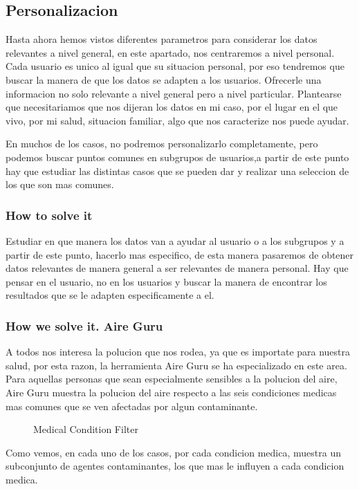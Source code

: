 \subsection{Personalizacion}
Hasta ahora hemos vistos diferentes parametros para considerar los datos relevantes a nivel general, en este apartado, nos
centraremos a nivel personal.
Cada usuario es unico al igual que su situacion personal, por eso tendremos que buscar la manera de que los datos se 
adapten a los usuarios. Ofrecerle una informacion no solo relevante a nivel general pero a nivel particular.
Plantearse que necesitariamos que nos dijeran los datos en mi caso, por el lugar en el que vivo, por
mi salud, situacion familiar, algo que nos caracterize nos puede ayudar.

En muchos de los casos, no podremos personalizarlo completamente, pero podemos buscar puntos comunes en subgrupos de 
usuarios,a partir de este punto hay que estudiar las distintas casos que se pueden dar y realizar una seleccion de los que son 
mas comunes.
\subsubsection{How to solve it} 

 Estudiar en que manera los datos van a ayudar al usuario o a los subgrupos y a partir de este punto, hacerlo mas especifico, de esta manera
 pasaremos de obtener datos relevantes de manera general a ser relevantes de manera personal. Hay que pensar en el 
 usuario, no en los usuarios y buscar la manera de encontrar los resultados que se le adapten especificamente a el.



 \subsubsection{How we solve it. Aire Guru} 
A todos nos interesa la polucion que nos rodea, ya que es importate para nuestra salud, por esta razon, la herramienta
Aire Guru se ha especializado en este area. Para aquellas personas que sean especialmente sensibles a la polucion del
aire, Aire Guru muestra la polucion del aire respecto a las seis condiciones medicas mas comunes que 
se ven afectadas por algun contaminante.
 

\begin{figure}[ht]
    \centering
    \hfill
    \hfill
  
  \caption{Medical Condition Filter}
    \end{figure}
 Como vemos, en cada uno de los casos, por cada condicion medica, muestra un subconjunto de agentes contaminantes,
 los que mas le influyen a cada condicion medica.

